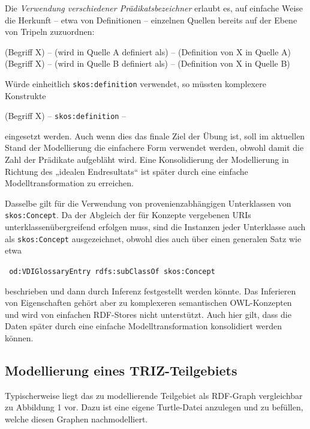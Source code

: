 \documentclass[11pt,a4paper]{article}
\begin{document}
Die \emph{Verwendung verschiedener Prädikatsbezeichner} erlaubt es, auf
einfache Weise die Herkunft -- etwa von Definitionen -- einzelnen Quellen
bereits auf der Ebene von Tripeln zuzuordnen:
\begin{center}
  (Begriff X) -- (wird in Quelle A definiert als) -- (Definition von X in
  Quelle A)\\ 
  (Begriff X) -- (wird in Quelle B definiert als) -- (Definition von X in
  Quelle B) 
\end{center}
Würde einheitlich \texttt{skos:definition} verwendet, so müssten komplexere
Konstrukte
\begin{center}
  (Begriff X) -- \texttt{skos:definition} -- 
\end{center}
eingesetzt werden. Auch wenn dies das finale Ziel der Übung ist, soll im
aktuellen Stand der Modellierung die einfachere Form verwendet werden, obwohl
damit die Zahl der Prädikate aufgebläht wird. Eine Konsolidierung der
Modellierung in Richtung des „idealen Endresultats“ ist später durch eine
einfache Modelltransformation zu erreichen.

Dasselbe gilt für die Verwendung von provenienzabhängigen Unterklassen von
\texttt{skos:Concept}.  Da der Abgleich der für Konzepte vergebenen URIs
unterklassenübergreifend erfolgen muss, sind die Instanzen jeder Unterklasse
auch als \texttt{skos:Concept} ausgezeichnet, obwohl dies auch über einen
generalen Satz wie etwa
\begin{center}\tt
  od:VDIGlossaryEntry rdfs:subClassOf skos:Concept
\end{center}
beschrieben und dann durch Inferenz festgestellt werden könnte. Das Inferieren
von Eigenschaften gehört aber zu komplexeren semantischen OWL-Konzepten und
wird von einfachen RDF-Stores nicht unterstützt. Auch hier gilt, dass die
Daten später durch eine einfache Modelltransformation konsolidiert werden
können.

\subsection{Modellierung eines TRIZ-Teilgebiets}

Typischerweise liegt das zu modellierende Teilgebiet als RDF-Graph
vergleichbar zu Abbildung 1 vor.  Dazu ist eine eigene Turtle-Datei anzulegen
und zu befüllen, welche diesen Graphen nachmodelliert.
\end{document}
